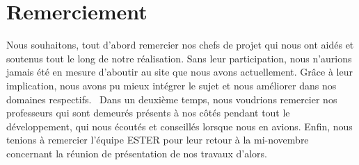 \chapter*{Remerciement}

Nous souhaitons, tout d'abord remercier nos chefs de projet qui nous ont aidés et soutenus tout le long de notre réalisation. Sans leur participation, nous n'aurions jamais été en mesure d'aboutir au site que nous avons actuellement. Grâce à leur implication, nous avons pu mieux intégrer le sujet et nous améliorer dans nos domaines respectifs. \
Dans un deuxième temps, nous voudrions remercier nos professeurs qui sont demeurés présents à nos côtés pendant tout le développement, qui nous écoutés et conseillés lorsque nous en avions.
Enfin, nous tenions à remercier l'équipe ESTER pour leur retour à la mi-novembre concernant la réunion de présentation de nos travaux d'alors. 